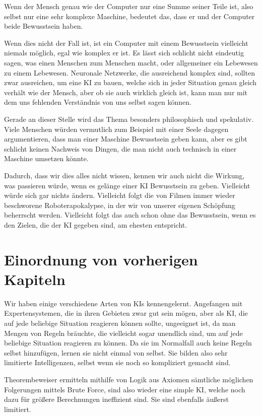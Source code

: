 Wenn der Mensch genau wie der Computer nur eine Summe seiner Teile ist, also selbst nur eine sehr komplexe Maschine, bedeutet das, dass er und der Computer beide Bewusstsein haben.

Wenn dies nicht der Fall ist, ist ein Computer mit einem Bewusstsein vielleicht niemals möglich, egal wie komplex er ist.
Es lässt sich schlicht nicht eindeutig sagen, was einen Menschen zum Menschen macht, oder allgemeiner ein Lebewesen zu einem Lebewesen.
Neuronale Netzwerke, die ausreichend komplex sind, sollten zwar ausreichen, um eine KI zu bauen, welche sich in jeder Situation genau gleich verhält wie der Mensch, aber ob sie auch wirklich gleich ist, kann man nur mit dem uns fehlenden Verständnis von uns selbst sagen können.

Gerade an dieser Stelle wird das Thema besonders philosophisch und spekulativ.
Viele Menschen würden vermutlich zum Beispiel mit einer Seele dagegen argumentieren, dass man einer Maschine Bewusstsein geben kann, aber es gibt schlicht keinen Nachweis von Dingen, die man nicht auch technisch in einer Maschine umsetzen könnte.

Dadurch, dass wir dies alles nicht wissen, kennen wir auch nicht die Wirkung, was passieren würde, wenn es gelänge einer KI Bewusstsein zu geben.
Vielleicht würde sich gar nichts ändern.
Vielleicht folgt die von Filmen immer wieder beschworene Roboterapokalypse, in der wir von unserer eigenen Schöpfung beherrscht werden.
Vielleicht folgt das auch schon ohne das Bewusstsein, wenn es den Zielen, die der KI gegeben sind, am ehesten entspricht.

\section{Einordnung von vorherigen Kapiteln}
Wir haben einige verschiedene Arten von KIs kennengelernt.
Angefangen mit Expertensystemen, die in ihren Gebieten zwar gut sein mögen, aber als KI, die auf jede beliebige Situation reagieren können sollte, ungeeignet ist, da man Mengen von  Regeln bräuchte, die vielleicht sogar unendlich sind, um auf jede beliebige Situation reagieren zu können.
Da sie im Normalfall auch keine Regeln selbst hinzufügen, lernen sie nicht einmal von selbst.
Sie bilden also sehr limitierte Intelligenzen, selbst wenn sie noch so kompliziert gemacht sind.

Theorembeweiser ermitteln mithilfe von Logik aus Axiomen sämtliche möglichen Folgerungen mittels Brute Force, sind also wieder eine simple KI, welche noch dazu für größere Berechnungen ineffizient sind.
Sie sind ebenfalls äußerst limitiert.

